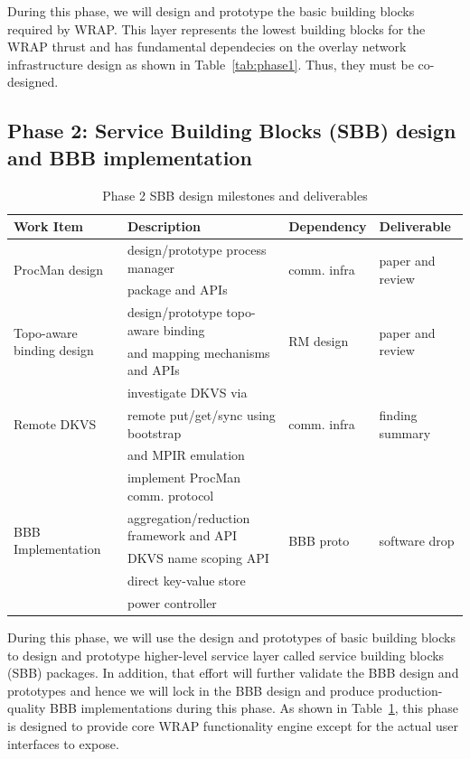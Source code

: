 \documentclass[10pt]{article}
\begin{document}
During this phase, we will design and prototype the basic building blocks required 
by WRAP. This layer represents the lowest building blocks for the WRAP thrust and has fundamental
dependecies on the overlay network infrastructure design as shown in Table~\ref{tab:phase1}.
Thus, they must be co-designed.

\subsection{Phase 2: Service Building Blocks (SBB) design and BBB implementation} 
\begin{table}
\centering
\begin{tabular}{|l|l|l|l|}
\hline
Work Item & Description & Dependency & Deliverable \\
\hline
\multirow{2}{*}{ProcMan design} & design/prototype process manager & \multirow{2}{*}{comm. infra} & \multirow{2}{*}{paper and review} \\
& package and APIs & & \\ \hline
\multirow{2}{*}{Topo-aware binding design} & design/prototype topo-aware binding & \multirow{2}{*}{RM design} & \multirow{2}{*}{paper and review} \\
& and mapping mechanisms and APIs & & \\ \hline
\multirow{3}{*}{Remote DKVS} & investigate DKVS via & \multirow{3}{*}{comm. infra} & \multirow{3}{*}{finding summary} \\
& remote put/get/sync using bootstrap & & \\
& and MPIR emulation & & \\ \hline 
\multirow{5}{*}{BBB Implementation} & implement ProcMan comm. protocol & \multirow{5}{*}{BBB proto} & \multirow{5}{*}{software drop} \\
& aggregation/reduction framework and API & & \\ 
& DKVS name scoping API & & \\ 
& direct key-value store & & \\ 
& power controller & & \\ \hline
\end{tabular}
\caption{Phase 2 SBB design milestones and deliverables}
\label{tab:phase2}
\end{table}

During this phase, we will use the design and prototypes of basic building blocks 
to design and prototype higher-level service layer called service building blocks (SBB) 
packages. In addition, that effort will further validate the BBB design and prototypes
and hence we will lock in the BBB design and produce production-quality BBB implementations
during this phase. 
As shown in Table~\ref{tab:phase2}, this phase is designed to provide core WRAP functionality
engine except for the actual user interfaces to expose.
\end{document}

